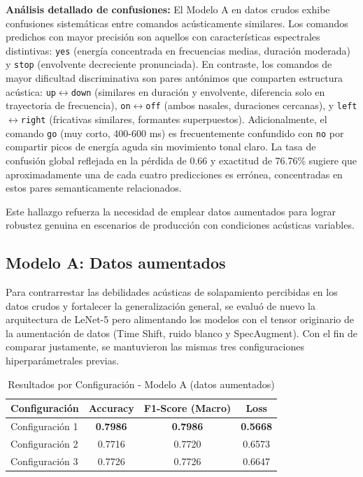 \documentclass[conference]{IEEEtran}
\begin{document}
\textbf{Análisis detallado de confusiones:} El Modelo A en datos crudos exhibe confusiones sistemáticas entre comandos acústicamente similares. Los comandos predichos con mayor precisión son aquellos con características espectrales distintivas: \texttt{yes} (energía concentrada en frecuencias medias, duración moderada) y \texttt{stop} (envolvente decreciente pronunciada). En contraste, los comandos de mayor dificultad discriminativa son pares antónimos que comparten estructura acústica: \texttt{up}$\leftrightarrow$\texttt{down} (similares en duración y envolvente, diferencia solo en trayectoria de frecuencia), \texttt{on}$\leftrightarrow$\texttt{off} (ambos nasales, duraciones cercanas), y \texttt{left}$\leftrightarrow$\texttt{right} (fricativas similares, formantes superpuestos). Adicionalmente, el comando \texttt{go} (muy corto, 400-600 ms) es frecuentemente confundido con \texttt{no} por compartir picos de energía aguda sin movimiento tonal claro. La tasa de confusión global reflejada en la pérdida de 0.66 y exactitud de 76.76\% sugiere que aproximadamente una de cada cuatro predicciones es errónea, concentradas en estos pares semanticamente relacionados.

Este hallazgo refuerza la necesidad de emplear datos aumentados para lograr robustez genuina en escenarios de producción con condiciones acústicas variables.

\subsection{Modelo A: Datos aumentados}

Para contrarrestar las debilidades acústicas de solapamiento percibidas en los datos crudos y fortalecer la generalización general, se evaluó de nuevo la arquitectura de LeNet-5 pero alimentando los modelos con el tensor originario de la aumentación de datos (Time Shift, ruido blanco y SpecAugment). Con el fin de comparar justamente, se mantuvieron las mismas tres configuraciones hiperparámetrales previas.

\begin{table}[htbp]
\caption{Resultados por Configuración - Modelo A (datos aumentados)}
\label{tab:metricas_a_configs_aug}
\centering
\begin{tabular}{lccc}
\toprule
\textbf{Configuración} & \textbf{Accuracy} & \textbf{F1-Score (Macro)} & \textbf{Loss} \\
\midrule
Configuración 1 & \textbf{0.7986} & \textbf{0.7986} & \textbf{0.5668} \\
Configuración 2 & 0.7716 & 0.7720 & 0.6573 \\
Configuración 3 & 0.7726 & 0.7726 & 0.6647 \\
\bottomrule
\end{tabular}
\end{table}
\end{document}
